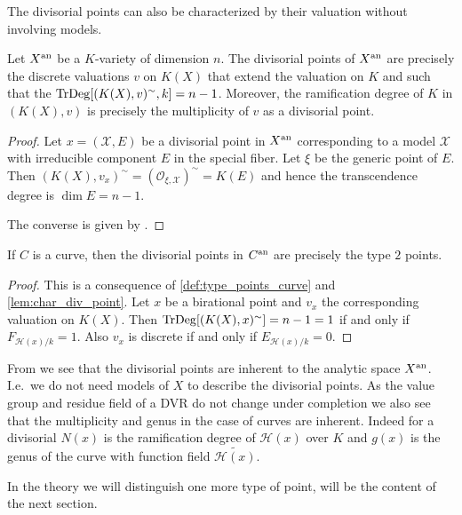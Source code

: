 The divisorial points can also be characterized by their valuation without involving models. 
\begin{lemma}\label{lem:char_div_point}
	Let $X{}^{\text{an}}$ be a $K$-variety of dimension $n$. 
	The divisorial points of $X{}^{\text{an}}$ are precisely the discrete valuations $v$ on $K(X)$ that extend the valuation on $K$ and such that the $\operatorname{TrDeg} [(K(X),v)^{\sim}, k] = n-1$.
	Moreover, the ramification degree of $K$ in $(K(X), v)$ is precisely the multiplicity of $v$ as a divisorial point.  
\end{lemma}
\begin{proof}
	Let $x = (\mathscr X, E)$ be a divisorial point in $X{}^{\text{an}}$ corresponding to a model $\mathscr X$ with irreducible component $E$ in the special fiber.
	Let $\xi$ be the generic point of $E$. 
	Then $(K(X), v_x)^{\sim} = (\mathcal{O}_{\xi, \mathscr X})^{\sim} = K(E)$ and hence the transcendence degree is $\dim E = n-1$.

	The converse is given by \cite[lem 2.45]{kollarBirationalGeometryAlgebraic1998}. 
\end{proof}

\begin{remark}
	 If $C$ is a curve, then the divisorial points in $C{}^{\text{an}}$ are precisely the type $2$ points. 
\end{remark}
\begin{proof}
	This is a consequence of \cref{def:type_points_curve} and \cref{lem:char_div_point}.
	Let $x$ be a birational point and $v_x$ the corresponding valuation on $K(X)$.
	Then $\operatorname{TrDeg}[(K(X),x)^{\sim} ] = n-1 = 1 $ if and only if $F_{\mathcal{H} (x) / k} = 1$.
	Also $v_x$ is discrete if and only if $E_{\mathcal{H} (x) / k}= 0$. 
\end{proof}


\begin{remark}
	From \label{lem:char_div_point} we see that the divisorial points are inherent to the analytic space $X{}^{\text{an}}$. 
	I.e.\ we do not need models of $X$ to describe the divisorial points. 
	As the value group and residue field of a DVR do not change under completion we also see that the multiplicity and genus in the case of curves are inherent. 
	Indeed for a divisorial $N(x)$ is the ramification degree of $\mathcal{H} (x)$ over $K$ and $g(x)$ is the genus of the curve with function field $\widetilde{\mathcal{H} (x)}$. 
\end{remark}

In the theory we will distinguish one more type of point, will be the content of the next section.
